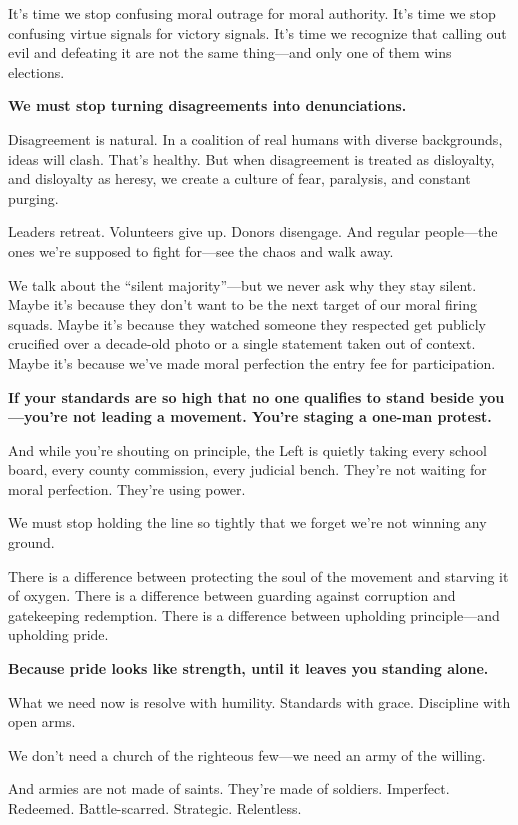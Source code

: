 It’s time we stop confusing moral outrage for moral authority. It’s time we stop confusing virtue signals for victory signals. It’s time we recognize that calling out evil and defeating it are not the same thing—and only one of them wins elections.

\textbf{We must stop turning disagreements into denunciations.}

Disagreement is natural. In a coalition of real humans with diverse backgrounds, ideas will clash. That’s healthy. But when disagreement is treated as disloyalty, and disloyalty as heresy, we create a culture of fear, paralysis, and constant purging.

Leaders retreat. Volunteers give up. Donors disengage. And regular people—the ones we’re supposed to fight for—see the chaos and walk away.

We talk about the ``silent majority''—but we never ask why they stay silent. Maybe it’s because they don’t want to be the next target of our moral firing squads. Maybe it's because they watched someone they respected get publicly crucified over a decade-old photo or a single statement taken out of context. Maybe it's because we’ve made moral perfection the entry fee for participation.

\textbf{If your standards are so high that no one qualifies to stand beside you—you're not leading a movement. You're staging a one-man protest.}

And while you're shouting on principle, the Left is quietly taking every school board, every county commission, every judicial bench. They’re not waiting for moral perfection. They're using power.

We must stop holding the line so tightly that we forget we’re not winning any ground.

There is a difference between protecting the soul of the movement and starving it of oxygen. There is a difference between guarding against corruption and gatekeeping redemption. There is a difference between upholding principle—and upholding pride.

\textbf{Because pride looks like strength, until it leaves you standing alone.}

What we need now is resolve with humility. Standards with grace. Discipline with open arms.

We don’t need a church of the righteous few—we need an army of the willing.

And armies are not made of saints. They're made of soldiers. Imperfect. Redeemed. Battle-scarred. Strategic. Relentless.

